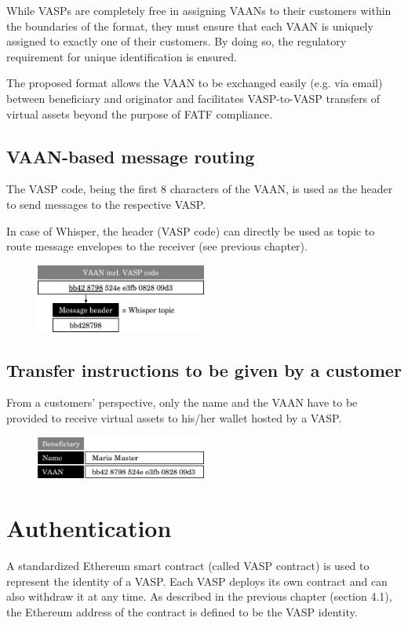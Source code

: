 \documentclass{article}
\begin{document}
While VASPs are completely free in assigning VAANs to their customers within the boundaries of the format, they must ensure that each VAAN is uniquely assigned to exactly one of their customers. By doing so, the regulatory requirement for unique identification is ensured.

The proposed format allows the VAAN to be exchanged easily (e.g. via email) between beneficiary and originator and facilitates VASP-to-VASP transfers of virtual assets beyond the purpose of FATF compliance.

\subsection{VAAN-based message routing}
The VASP code, being the first 8 characters of the VAAN, is used as the header to send messages to the respective VASP.

In case of Whisper, the header (VASP code) can directly be used as topic to route message envelopes to the receiver (see previous chapter).

\vspace{1em}
\begin{figure}[h]
    \centering
    \includegraphics[width=0.5\textwidth]{g3.pdf}
\end{figure}
\newpage

\subsection{Transfer instructions to be given by a customer}
From a customers’ perspective, only the name and the VAAN have to be provided to receive virtual assets to his/her wallet hosted by a VASP.

\begin{figure}[h]
    \centering
    \includegraphics[width=0.5\textwidth]{g4.pdf}
\end{figure}
\newpage

\section{Authentication}
A standardized Ethereum smart contract (called VASP contract) is used to represent the identity of a VASP. Each VASP deploys its own contract and can also withdraw it at any time. As described in the previous chapter (section 4.1), the Ethereum address of the contract is defined to be the VASP identity.
\end{document}
